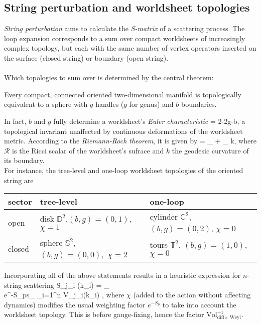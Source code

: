 \subsection{String perturbation and worldsheet topologies}
\emph{String perturbation} aims to calculate the \emph{S-matrix} of a scattering process. The loop expansion corresponds to a sum over compact worldsheets of increasingly complex topology, but each with the same number of vertex operators inserted on the surface (closed string) or boundary (open string).\\
\\
Which topologies to sum over is determined by the central theorem:
\begin{mybox}{}
	Every compact, connected oriented two-dimensional manifold is topologically equivalent to a sphere with $g$ handles ($g$ for genus) and $b$ boundaries.
\end{mybox}
In fact, $b$ and $g$ fully determine a worldsheet's \emph{Euler characteristic} 
\be 
\chi = 2-2g-b,
\ee 
a topological invariant unaffected by continuous deformations of the worldsheet metric. According to the \emph{Riemann-Roch theorem}, it is given by
\be 
\chi = \int_\Sigma \frac{\md^2 \xi}{4 \pi}   + \int_{\partial \Sigma}  k,
\ee 
where $\mathcal{R}$ is the Ricci scalar of the worldsheet's sufrace and $k$ the geodesic curvature of its boundary.\\
For instance, the tree-level and one-loop worldsheet topologies of the oriented string are
\bse 
\begin{tabular}{|lll|}
sector & tree-level & one-loop\\
	\toprule
	open & disk $\mathbb{D}^2$,$(b,g)=(0,1)$, $\chi=1$ & cylinder $\mathbb{C}^2$, $(b,g)=(0,2)$, $\chi=0$\\
	closed & sphere $\mathbb{S}^2$, $(b,g)=(0,0),$ $\chi=2$ & tours $\mathbb{T}^2$, $(b,g)=(1,0)$, $\chi=0$ \\
	\bottomrule 
\end{tabular}
\ese 
Incorporating all of the above statements results in a heuristic expression for $n$-string scattering
\be 
S_{j_i} (k_i) = \sum_{\\
	}  e^{-S_ps\lambda_\chi } \prod_{i=1}^n V_{j_i}(k_i) ,
\ee 
where $\chi$ (added to the action without affecting dynamics) modifies the usual weighting factor $e^{-S_p}$ to take into account the worldsheet topology. This is before gauge-fixing, hence the factor $\text{Vol}^{-1}_{\text{diff} \times\text{ Weyl}}.$


